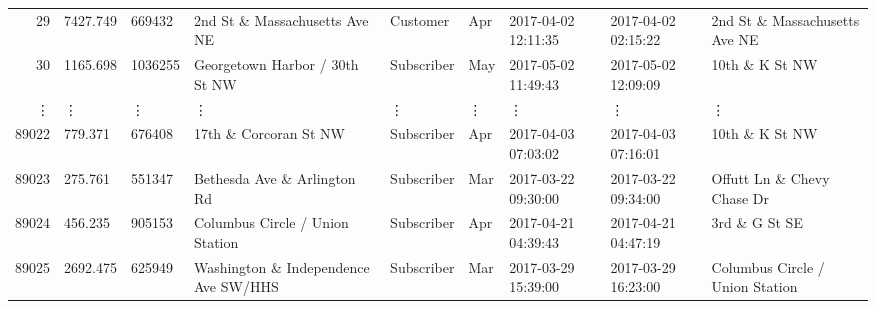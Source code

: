 \documentclass[11pt]{article}
\begin{document}
\begin{tabular}{r|llllllll}
	29 & 7427.749                                                &  669432                                                 & 2nd St \& Massachusetts Ave NE                         & Customer                                                & Apr                                                     & 2017-04-02 12:11:35                                     & 2017-04-02 02:15:22                                     & 2nd St \& Massachusetts Ave NE                        \\
	30 & 1165.698                                              & 1036255                                               & Georgetown Harbor / 30th St NW                        & Subscriber                                            & May                                                   & 2017-05-02 11:49:43                                   & 2017-05-02 12:09:09                                   & 10th \& K St NW                                     \\
	⋮ & ⋮ & ⋮ & ⋮ & ⋮ & ⋮ & ⋮ & ⋮ & ⋮\\
	89022 &  779.371                                           &  676408                                            & 17th \& Corcoran St NW                            & Subscriber                                         & Apr                                                & 2017-04-03 07:03:02                                & 2017-04-03 07:16:01                                & 10th \& K St NW                                  \\
	89023 &  275.761                                           &  551347                                            & Bethesda Ave \& Arlington Rd                      & Subscriber                                         & Mar                                                & 2017-03-22 09:30:00                                & 2017-03-22 09:34:00                                & Offutt Ln \& Chevy Chase Dr                      \\
	89024 &  456.235                                         &  905153                                          & Columbus Circle / Union Station                  & Subscriber                                       & Apr                                              & 2017-04-21 04:39:43                              & 2017-04-21 04:47:19                              & 3rd \& G St SE                                 \\
	89025 & 2692.475                                           &  625949                                            & Washington \& Independence Ave SW/HHS             & Subscriber                                         & Mar                                                & 2017-03-29 15:39:00                                & 2017-03-29 16:23:00                                & Columbus Circle / Union Station                   \\

\end{tabular}
\end{document}
